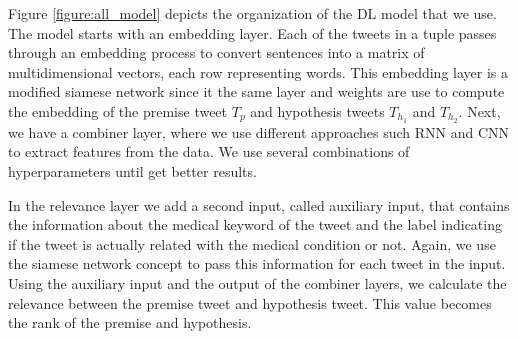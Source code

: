 \documentclass[12pt]{report}
\begin{document}

Figure \ref{figure:all_model} depicts the organization of the \ac{DL} model that we use.
The  model starts with an embedding layer. Each of the tweets in a tuple passes through an embedding process to convert sentences into a matrix of multidimensional vectors, each row representing words. This embedding layer is a modified siamese network since it the same layer and weights are 
use to compute the embedding of the premise tweet $T_p$ and hypothesis tweets $T_{h_1}$ and $T_{h_2}$.  Next, we have a combiner layer, where we use different approaches such \ac{RNN} and \ac{CNN} to extract 
features from the data.
We use  several combinations of hyperparameters until get better results.

In the relevance layer we add a second input, called auxiliary input, that contains the information about the medical keyword of the tweet and the label indicating if the tweet is actually related with the medical condition or not. Again, we use the siamese network concept to pass this information for each tweet in the input.
Using the auxiliary input and the output of the combiner layers, we calculate the relevance between the premise tweet and hypothesis tweet. This value becomes the rank of the premise and hypothesis. 
\end{document}
